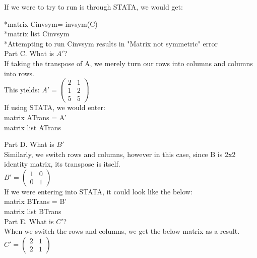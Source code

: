\documentclass{article}
\begin{document}
If we were to try to run is through STATA, we would get:

*matrix Cinvsym= invsym(C)\\
*matrix list Cinvsym\\
*Attempting to run Cinvsym results in "Matrix not symmetric" error \\

Part C. What is $A'$?\\

If taking the transpose of A, we merely turn our rows into columns and columns into rows.\\

This yields: $A' = \left( \begin{smallmatrix} 2&1\\1&2\\5&5 \end{smallmatrix} \right)$\\

If using STATA, we would enter:\\

matrix ATrans = A'\\
matrix list ATrans

Part D. What is $B'$\\

Similarly, we switch rows and columns, however in this case, since B is 2x2 identity matrix, its transpose is itself.\\

$B' = \left( \begin{smallmatrix} 1&0\\0&1 \end{smallmatrix} \right)$\\

If we were entering into STATA, it could look like the below:\\

matrix BTrans = B'\\
matrix list BTrans\\

Part E. What is $C'$?\\

When we switch the rows and columns, we get the below matrix as a result.\\

$C' = \left( \begin{smallmatrix} 2&1\\2&1 \end{smallmatrix} \right)$
\end{document}
